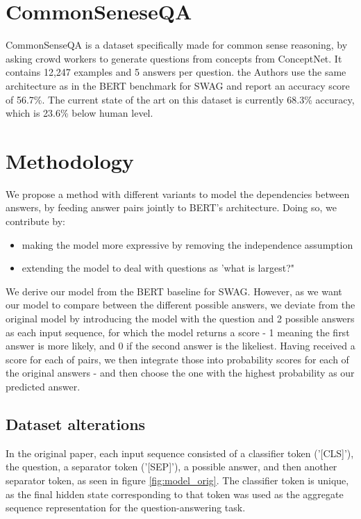 \documentclass{article}
\begin{document}

\section{CommonSeneseQA}
CommonSenseQA is a dataset specifically made for common sense reasoning, by asking crowd workers to generate questions from concepts from ConceptNet. It contains 12,247 examples and 5 answers per question. 
the Authors use the same architecture as in the BERT benchmark for SWAG and report an accuracy score of 56.7\%. The current state of the art on this dataset is currently 68.3\% accuracy, which is 23.6\% below human level.

\section{Methodology}
We propose a method with different variants to model the dependencies between answers, by feeding answer pairs jointly to BERT's architecture. Doing so, we contribute by:

\begin{itemize}
\item making the model more expressive by removing the independence assumption
\item extending the model to deal with questions as 'what is largest?"
\end{itemize}

We derive our model from the BERT baseline for SWAG. However, as we want our model to compare between the different possible answers, we deviate from the original model by introducing the model with the question and 2 possible answers as each input sequence, for which the model returns a score - 1 meaning the first answer is more likely, and 0 if the second answer is the likeliest. Having received a score for each of pairs, we then integrate those into probability scores for each of the original answers - and then choose the one with the highest probability as our predicted answer.

\subsection{Dataset alterations}

In the original paper, each input sequence consisted of a classifier token ('[CLS]'), the question, a separator token ('[SEP]'), a possible answer, and then another separator token, as seen in figure \ref{fig:model_orig}. The classifier token is unique, as the final hidden state corresponding to that token was used as the aggregate sequence representation for the question-answering task.
\end{document}
